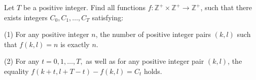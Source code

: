 Let $T$ be a positive integer. Find all functions $f: \mathbb {Z}^+ \times \mathbb {Z}^+ \to \mathbb {Z}^+$, such that there exists integers $C_0,C_1,\ldots ,C_T$ satisfying:

(1) For any positive integer $n$, the number of positive integer pairs $(k,l)$ such that $f(k,l)=n$ is exactly $n$.

(2) For any $t=0,1,\ldots ,T,$ as well as for any positive integer pair $(k,l)$, the equality $f(k+t,l+T-t)-f(k,l)=C_t$ holds.